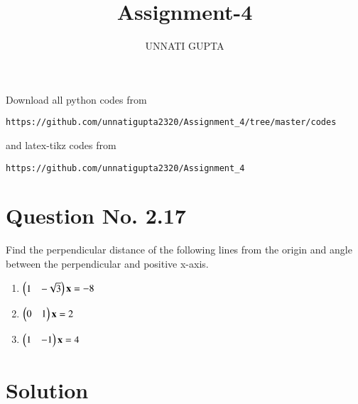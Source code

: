 \documentclass[journal,12pt,twocolumn]{IEEEtran}
\begin{document}
     \def\centbox#1{\makebox[0in]{#1}}
     \def\topbox#1{\raisebox{-\baselineskip}[0in][0in]{#1}}
     \def\midbox#1{\raisebox{-0.5\baselineskip}[0in][0in]{#1}}
\vspace{3cm}
\title{Assignment-4}
\author{UNNATI GUPTA}
\maketitle
\newpage
\bigskip
\renewcommand{\thefigure}{\theenumi}
\renewcommand{\thetable}{\theenumi}
Download all python codes from 
\begin{lstlisting}
https://github.com/unnatigupta2320/Assignment_4/tree/master/codes
\end{lstlisting}
%
and latex-tikz codes from 
%
\begin{lstlisting}
https://github.com/unnatigupta2320/Assignment_4
\end{lstlisting}
%
\section{Question No. 2.17}
Find the perpendicular distance of the following lines from the origin and angle between the perpendicular and positive x-axis.
\begin{enumerate}[label=\alph*.]
    \item  $\begin{pmatrix}1&-\sqrt{3}\end{pmatrix}\mathbf{x} =-8$
    \item  $\begin{pmatrix}0&1\end{pmatrix}\mathbf{x} =2$
    \item $\begin{pmatrix}1&-1\end{pmatrix}\mathbf{x} =4$
\end{enumerate}

%
\section{Solution}
\end{document}

